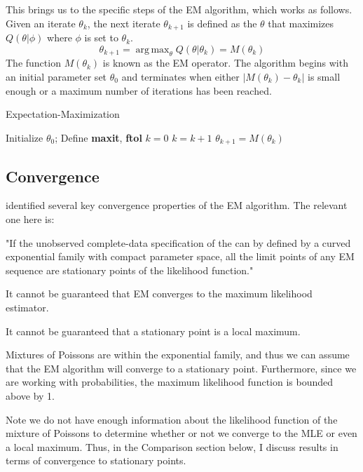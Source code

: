 \documentclass[letter,12pt]{article}
\DeclareMathOperator*{\argmax}{arg\,max}
\begin{document}
This brings us to the specific steps of the EM algorithm, which works as follows.  Given an iterate $\theta_k$, the next iterate $\theta_{k+1}$ is defined as the $\theta$ that maximizes $Q(\theta|\phi)$ where $\phi$ is set to $\theta_k$.
\[
\theta_{k+1} = \argmax_{\theta}  Q(\theta|\theta_k) = M(\theta_k)
\]
The function $M(\theta_k)$ is known as the EM operator.  The algorithm begins with an initial parameter set $\theta_0$ and terminates when either $|M(\theta_k)-\theta_k|$ is small enough or a maximum number of iterations has been reached.


\begin{algorithm}
\caption{Expectation-Maximization}
\label{alg:em}
\begin{algorithmic}[1]
\State Initialize $\theta_0$; Define \textbf{maxit}, \textbf{ftol}
\State $k = 0$
\State $k = k+1$
\State $\theta_{k+1} = M(\theta_k)$
\EndWhile
\end{algorithmic}
\end{algorithm}

\subsection{Convergence} \label{section:convergence}

\cite{wu1983} identified several key convergence properties of the EM algorithm.  The relevant one here is:
\begin{list}{-}{}
\item "If the unobserved complete-data specification of the can by defined by a curved exponential family with compact parameter space, all the limit points of any EM sequence are stationary points of the likelihood function."
\item It cannot be guaranteed that EM converges to the maximum likelihood estimator.
\item It cannot be guaranteed that a stationary point is a local maximum.
\end{list}

Mixtures of Poissons are within the exponential family, and thus we can assume that the EM algorithm will converge to a stationary point.  Furthermore, since we are working with probabilities, the maximum likelihood function is bounded above by 1. 

Note we do not have enough information about the likelihood function of the mixture of Poissons to determine whether or not we converge to the MLE or even a local maximum.  Thus, in the Comparison section below, I discuss results in terms of convergence to stationary points.
\end{document}
